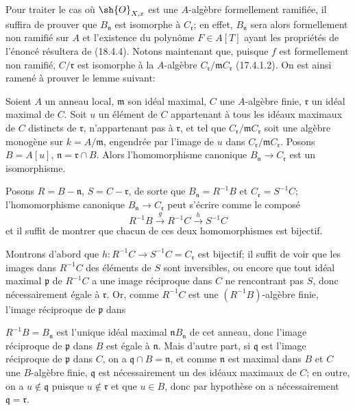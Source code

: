 Pour traiter le cas où $\sh{O}_{X,x}$ est une $A$-algèbre formellement ramifiée, il suffira de prouver que $B_{\mathfrak n}$ est isomorphe à $C_{\mathfrak r}$; en effet, $B_{\mathfrak n}$ sera alors formellement non ramifié sur $A$ et l'existence du polynôme $F\in A[T]$ ayant les propriétés de l'énoncé résultera de (18.4.4). Notons maintenant que, puisque $f$ est formellement non ramifié, $C/\mathfrak r$ est isomorphe à la $A$-algèbre $C_{\mathfrak r}/\mathfrak mC_{\mathfrak r}$ (17.4.1.2). On est ainsi ramené à prouver le lemme suivant:

\begin{lemma}[18.4.6.1]
\label{IV.18.4.6.1}
Soient $A$ un anneau local, $\mathfrak m$ son idéal maximal, $C$ une $A$-algèbre finie, $\mathfrak r$ un idéal maximal de $C$. Soit $u$ un élément de $C$ appartenant à tous les idéaux maximaux de $C$ distincts de $\mathfrak r$, n'appartenant pas à $\mathfrak r$, et tel que $C_{\mathfrak r}/\mathfrak mC_{\mathfrak r}$ soit une algèbre monogène sur $k=A/\mathfrak m$, engendrée par l'image de $u$ dans $C_{\mathfrak r}/\mathfrak mC_{\mathfrak r}$. Posons $B=A[u]$, $\mathfrak n=\mathfrak r\cap B$. Alors l'homomorphisme canonique $B_{\mathfrak n}\to C_{\mathfrak r}$ est un isomorphisme.
\end{lemma}

Posons $R=B-\mathfrak n$, $S=C-\mathfrak r$, de sorte que $B_{\mathfrak n}=R^{-1}B$ et $C_{\mathfrak r}=S^{-1}C$; l'homomorphisme canonique $B_{\mathfrak n}\to C_{\mathfrak r}$ peut s'écrire comme le composé
\[
  R^{-1}B\xrightarrow{g}R^{-1}C\xrightarrow{h}S^{-1}C
\]
et il suffit de montrer que chacun de ces deux homomorphismes est bijectif.

Montrons d'abord que $h:R^{-1}C\to S^{-1}C=C_{\mathfrak r}$ est bijectif; il suffit de voir que les images dans $R^{-1}C$ des éléments de $S$ sont inversibles, ou encore que tout idéal maximal $\mathfrak p$ de $R^{-1}C$ a une image réciproque dans $C$ ne rencontrant pas $S$, donc nécessairement égale à $\mathfrak r$. Or, comme $R^{-1}C$ est une $(R^{-1}B)$-algèbre finie, l'image réciproque de $\mathfrak p$ dans


$R^{-1}B=B_{\mathfrak n}$ est l'unique idéal maximal $\mathfrak nB_{\mathfrak n}$ de cet anneau, donc l'image réciproque de $\mathfrak p$ dans $B$ est égale à $\mathfrak n$. Mais d'autre part, si $\mathfrak q$ est l'image réciproque de $\mathfrak p$ dans $C$, on a $\mathfrak q\cap B=\mathfrak n$, et comme $\mathfrak n$ est maximal dans $B$ et $C$ une $B$-algèbre finie, $\mathfrak q$ est nécessairement un des idéaux maximaux de $C$; en outre, on a $u\notin\mathfrak q$ puisque $u\notin\mathfrak r$ et que $u\in B$, donc par hypothèse on a nécessairement $\mathfrak q=\mathfrak r$.

